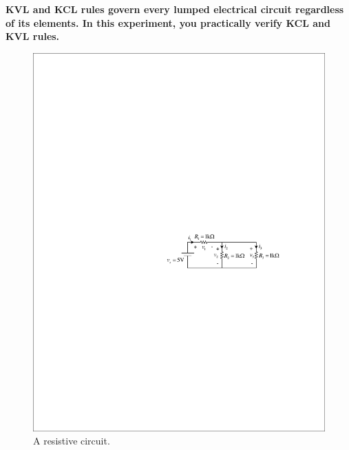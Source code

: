 \documentclass[11pt]{article}
\begin{document}
\textbf{KVL and KCL rules govern every lumped electrical circuit regardless of its elements. In this experiment, you practically verify KCL and KVL rules.
}



\begin{question}


    \begin{figure}[H]
        \centering
        \includegraphics[scale=1.2,angle=0]{Fig/cir1.pdf}
        \caption{A resistive circuit.} \label{fig:cir1}
    \end{figure}


\end{question}
\end{document}
